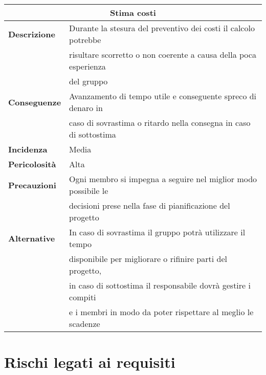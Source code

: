 \begin{center}
    \begin{tabularx}{0.8\linewidth}{l|l}
        \multicolumn{2}{c}{\textbf{Stima costi}}                                                               \\
        \hline{\textbf{Descrizione}}    & Durante la stesura del preventivo dei costi il calcolo potrebbe      \\
                                        & risultare scorretto o non coerente a causa della poca esperienza     \\
                                        & del gruppo                                                           \\                                 
        \textbf{Conseguenze}            & Avanzamento di tempo utile e conseguente spreco di denaro in         \\
                                        & caso di sovrastima o ritardo nella consegna in caso di sottostima    \\
        \textbf{Incidenza}              & Media                                                                \\
        \textbf{Pericolosità}           & Alta                                                                 \\
        \textbf{Precauzioni}            & Ogni membro si impegna a seguire nel miglior modo possibile le       \\
                                        & decisioni prese nella fase di pianificazione del progetto            \\
        \textbf{Alternative}            & In caso di sovrastima il gruppo potrà utilizzare il tempo            \\
                                        & disponibile per migliorare o rifinire parti del progetto,            \\ 
                                        & in caso di sottostima il responsabile dovrà gestire i compiti        \\
                                        & e i membri in modo da poter rispettare al meglio le scadenze         \\ 
    \end{tabularx}
\end{center}


\section{Rischi legati ai requisiti}

